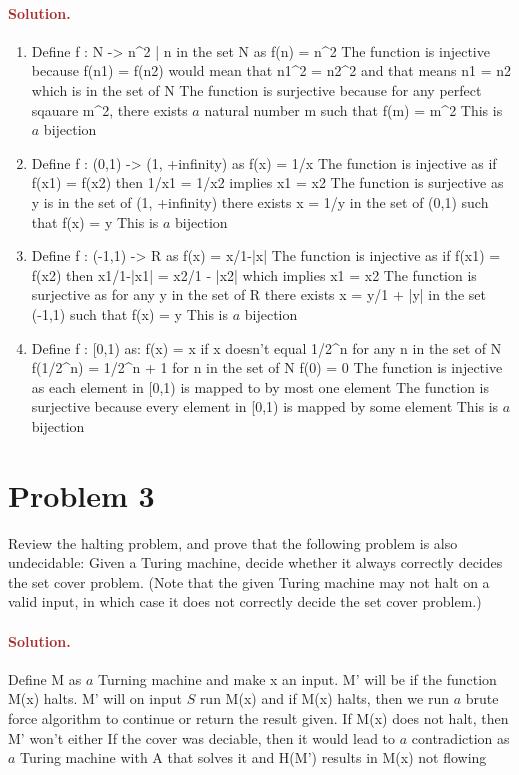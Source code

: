 \paragraph{\textcolor{brown}{Solution.}}
\begin{enumerate}
    \item Define f : N -> {n^2 | n in the set N} as f(n) = n^2
            The function is injective because f(n1) = f(n2) would mean that n1^2 = n2^2 and that means n1 = n2 which is in the set of N
            The function is surjective because for any perfect sqauare m^2, there exists $a$ natural number m such that f(m) = m^2
            This is $a$ bijection
    \item   Define f : (0,1) -> (1, +infinity) as f(x) = 1/x
            The function is injective as if f(x1) = f(x2) then 1/x1 = 1/x2 implies x1 = x2
            The function is surjective as y is in the set of (1, +infinity) there exists x = 1/y in the set of (0,1) such that f(x) = y 
            This is $a$ bijection
    \item   Define f : (-1,1) -> R as f(x) = x/1-|x|
            The function is injective as if f(x1) = f(x2) then x1/1-|x1| = x2/1 - |x2| which implies x1 = x2
            The function is surjective as for any y in the set of R there exists x = y/1 + |y| in the set (-1,1) such that f(x) = y
            This is $a$ bijection
    \item   Define f : [0,1) as:
                f(x) = x if x doesn't equal 1/2^n for any n in the set of N
                f(1/2^n) = 1/2^n + 1 for n in the set of N
                f(0) = 0
                The function is injective as each element in [0,1) is mapped to by most one element
                The function is surjective because every element in [0,1) is mapped by some element
                This is $a$ bijection
\end{enumerate}



\section*{Problem 3}
Review the halting problem, and prove that the following problem is also undecidable: Given a Turing machine, decide whether it always correctly decides the set cover problem. (Note that the given Turing machine may not halt on a valid input, in which case it does not correctly decide the set cover problem.)

\paragraph{\textcolor{brown}{Solution.}}
Define M as $a$ Turning machine and make x an input. M' will be if the function M(x) halts.
M' will on input $S$ run M(x) and if M(x) halts, then we run $a$ brute force algorithm to continue or return the result given. If M(x) does not halt, then M' won't either
If the cover was deciable, then it would lead to $a$ contradiction as $a$ Turing machine with A that solves it and H(M') results in M(x) not flowing


